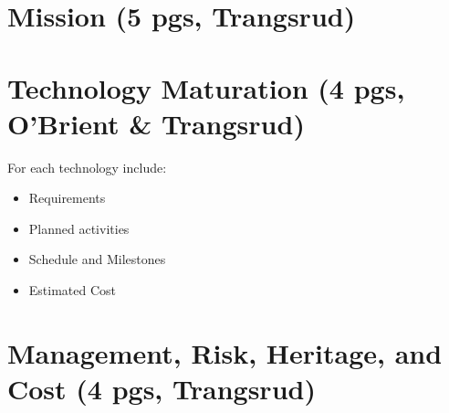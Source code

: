 \documentclass[12pt]{article}
\begin{document}



\section{Mission (5 pgs, Trangsrud)}




\section{Technology Maturation (4 pgs, O'Brient \& Trangsrud)}



For each technology include:
\begin{itemize}
\item Requirements
\item Planned activities
\item Schedule and Milestones
\item Estimated Cost
\end{itemize}


\section{Management, Risk, Heritage, and Cost (4 pgs, Trangsrud)}




\newpage




\end{document}
